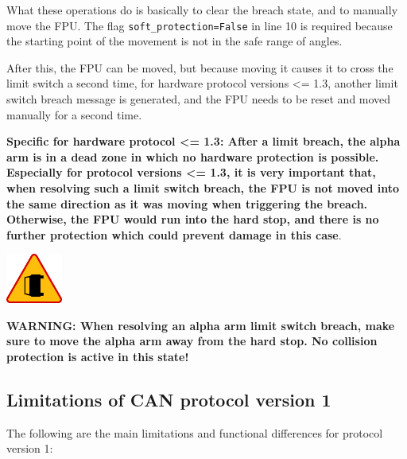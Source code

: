 \documentclass[11pt,a4paper]{scrartcl}
\newenvironment{warning}{\begin{framed}\includegraphics[width=5em]{accident-area-ahead.png}
}{\end{framed}}
\begin{document}
What these operations do is basically to clear the breach state, and
to manually move the FPU.  The flag \texttt{soft\_protection=False} in
line 10 is required because the starting point of the movement
is not in the safe range of angles.

After this, the FPU can be moved, but because moving it causes it to
cross the limit switch a second time, for hardware protocol versions
<= 1.3, another limit switch breach message is generated, and the FPU
needs to be reset and moved manually for a second time.

  \textbf{Specific for
  hardware protocol <= 1.3: After a limit breach, the alpha arm is in
  a dead zone in which no hardware protection is possible.  Especially
  for protocol versions <= 1.3, it is very important that, when
  resolving such a limit switch breach, the FPU is not moved into the
  same direction as it was moving when triggering the breach.
  Otherwise, the FPU would run into the hard stop, and there is no
  further protection which could prevent damage in this case}.

\begin{warning}
  \textbf{WARNING: When resolving an alpha arm limit switch breach,
    make sure to move the alpha arm away from the hard stop.  No
    collision protection is active in this state!}
\end{warning}

\subsection{Limitations of CAN protocol version 1}
The following are the main limitations and functional
differences for protocol version 1:
\end{document}
